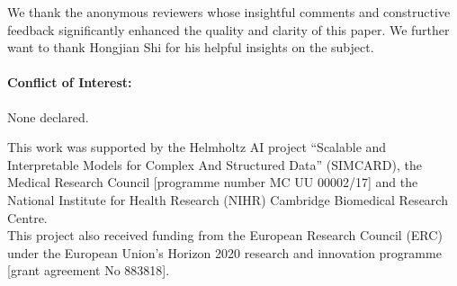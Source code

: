 \documentclass[ejs,noshowframe]{imsart}
\theoremstyle{plain}
\begin{document}
\begin{acks}[Acknowledgments]
    We thank the anonymous reviewers whose insightful comments and constructive feedback significantly enhanced the quality and clarity of this paper. We further want to thank Hongjian Shi for his helpful insights on the subject.\\

    \paragraph{Conflict of Interest:} None declared.
\end{acks}


\begin{funding}
    This work was supported by the Helmholtz AI project
    ``Scalable and Interpretable Models for Complex And Structured Data'' (SIMCARD),
    the Medical Research Council [programme number
            MC UU 00002/17] and the National Institute for Health Research (NIHR) Cambridge Biomedical Research Centre.
    \\

    \noindent This project also received funding from the European Research Council (ERC) under the European Union’s Horizon 2020 research and innovation programme [grant agreement No 883818].

\end{funding}

\end{document}
